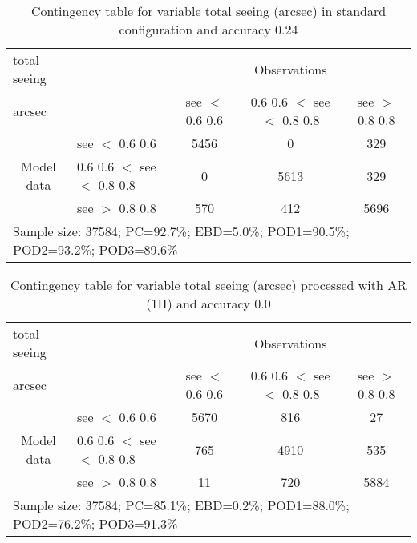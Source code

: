 \documentclass[11pt,english]{article}
\begin{document}
\begin{table}[]
\begin{center}
\begin{tabular}{llccc}
\hline
{total seeing}                                       &                                                    & \multicolumn{3}{c}{Observations}                 \\
{arcsec}                                       &                             & see $<$ 0.6
0.6   & 0.6
0.6 $<$ see $<$ 0.8
0.8 & see $>$ 0.8
0.8 \\
\hline
\multicolumn{1}{c}{\multirow{3}{*}{Model data}}  & see $<$ 0.6
0.6             & 5456                & 0                       & 329              \\
                                                 & 0.6
0.6  $<$ see $<$ 0.8
0.8 & 0                & 5613                       & 329              \\
                                                 & see $>$ 0.8
0.8             & 570                & 412                       & 5696              \\
\hline
\multicolumn{5}{l}{Sample size: 37584; PC=92.7\%; EBD=5.0\%; POD1=90.5\%; POD2=93.2\%; POD3=89.6\%}
\end{tabular}
\end{center}
\caption{Contingency table for variable total seeing (arcsec) in standard configuration and accuracy 0.24}
\label{tab:contingencyseeBEF}
\end{table}
\begin{table}[]
\begin{center}
\begin{tabular}{llccc}
\hline
{total seeing}                                       &                                                    & \multicolumn{3}{c}{Observations}                 \\
{arcsec}                                       &                             & see $<$ 0.6
0.6   & 0.6
0.6 $<$ see $<$ 0.8
0.8 & see $>$ 0.8
0.8 \\
\hline
\multicolumn{1}{c}{\multirow{3}{*}{Model data}}  & see $<$ 0.6
0.6             & 5670                & 816                       & 27              \\
                                                 & 0.6
0.6  $<$ see $<$ 0.8
0.8 & 765                & 4910                       & 535              \\
                                                 & see $>$ 0.8
0.8             & 11                & 720                       & 5884              \\
\hline
\multicolumn{5}{l}{Sample size: 37584; PC=85.1\%; EBD=0.2\%; POD1=88.0\%; POD2=76.2\%; POD3=91.3\%}
\end{tabular}
\end{center}
\caption{Contingency table for variable total seeing (arcsec) processed with AR (1H) and accuracy 0.0}
\label{tab:contingencyseeAFT}
\end{table}
\end{document}
